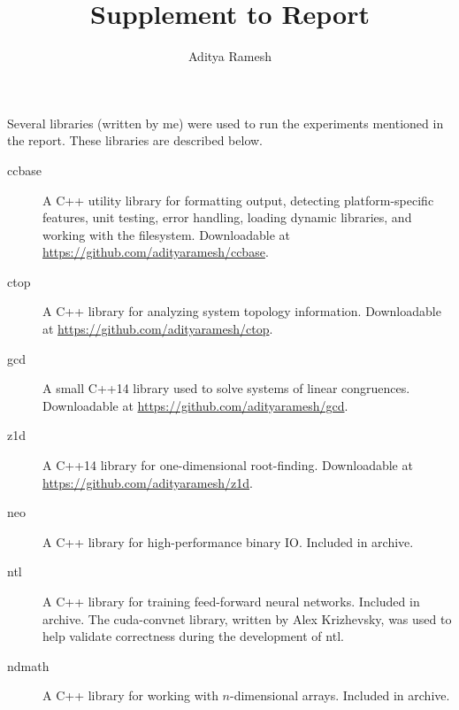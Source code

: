 \documentclass[11pt,a4paper]{article}
\title{Supplement to Report}
\author{Aditya Ramesh}
\date{}
\begin{document}
\maketitle

Several libraries (written by me) were used to run the experiments mentioned in
the report. These libraries are described below.
\begin{description}
\item[\textsf{ccbase}] A C++ utility library for formatting output, detecting
platform-specific features, unit testing, error handling, loading dynamic
libraries, and working with the filesystem. Downloadable at
\url{https://github.com/adityaramesh/ccbase}.

\item[\textsf{ctop}] A C++ library for analyzing system topology information.
Downloadable at \url{https://github.com/adityaramesh/ctop}.

\item[\textsf{gcd}] A small C++14 library used to solve systems of linear
congruences. Downloadable at \url{https://github.com/adityaramesh/gcd}.

\item[\textsf{z1d}] A C++14 library for one-dimensional root-finding.
Downloadable at \url{https://github.com/adityaramesh/z1d}.

\item[\textsf{neo}] A C++ library for high-performance binary IO. Included in
archive.

\item[\textsf{ntl}] A C++ library for training feed-forward neural networks.
Included in archive. The \textsf{cuda-convnet} library, written by Alex
Krizhevsky, was used to help validate correctness during the development of
\textsf{ntl}.

\item[\textsf{ndmath}] A C++ library for working with $n$-dimensional arrays.
Included in archive.
\end{description}
\end{document}
